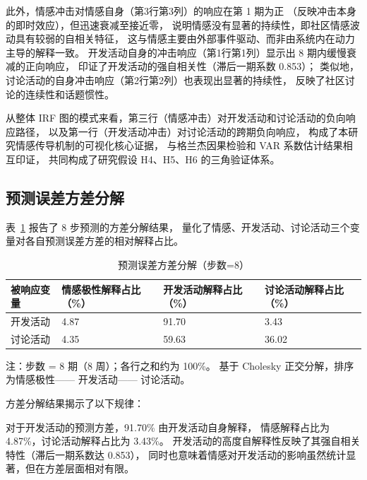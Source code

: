 \documentclass[
    type = master, %
    degree = professional,        %
    decl-page,  %
    twoside,                %
    fontset = fandol %
  ]{njuthesis}
\renewcommand{\footnotesize}{\zihao{-5}}
\begin{document}
此外，情感冲击对情感自身（第3行第3列）的响应在第 1 期为正
（反映冲击本身的即时效应），但迅速衰减至接近零，
说明情感没有显著的持续性，即社区情感波动具有较弱的自相关特征，
这与情感主要由外部事件驱动、而非由系统内在动力主导的解释一致。
开发活动自身的冲击响应（第1行第1列）显示出 8 期内缓慢衰减的正向响应，
印证了开发活动的强自相关性（滞后一期系数 0.853）；
类似地，讨论活动的自身冲击响应（第2行第2列）也表现出显著的持续性，
反映了社区讨论的连续性和话题惯性。

从整体 IRF 图的模式来看，第三行（情感冲击）对开发活动和讨论活动的负向响应路径，
以及第一行（开发活动冲击）对讨论活动的跨期负向响应，
构成了本研究情感传导机制的可视化核心证据，
与格兰杰因果检验和 VAR 系数估计结果相互印证，
共同构成了研究假设 H4、H5、H6 的三角验证体系。

\subsection{预测误差方差分解}

表~\ref{tab:fevd} 报告了 8 步预测的方差分解结果，
量化了情感、开发活动、讨论活动三个变量对各自预测误差方差的相对解释占比。

\begin{table}[htbp]
    \centering
    \small
    \caption{预测误差方差分解（步数=8）}
    \label{tab:fevd}
    \begin{tabularx}{\textwidth}{p{3.5cm}XXX}
        \toprule
        被响应变量 & 情感极性解释占比（\%） & 开发活动解释占比（\%） & 讨论活动解释占比（\%） \\
        \midrule
        开发活动    & 4.87 & 91.70 & 3.43 \\
        讨论活动 & 4.35 & 59.63 & 36.02 \\
        \bottomrule
    \end{tabularx}
    \begin{minipage}{\textwidth}
        \vspace{0.3em}
        \footnotesize 注：步数 = 8 期（8 周）；各行之和约为 100\%。
              基于 Cholesky 正交分解，排序为情感极性—— 开发活动—— 讨论活动。
    \end{minipage}
\end{table}

方差分解结果揭示了以下规律：

对于开发活动的预测方差，91.70\% 由开发活动自身解释，
情感解释占比为 4.87\%，讨论活动解释占比为 3.43\%。
开发活动的高度自解释性反映了其强自相关特性（滞后一期系数达 0.853），
同时也意味着情感对开发活动的影响虽然统计显著，但在方差层面相对有限。
\end{document}
